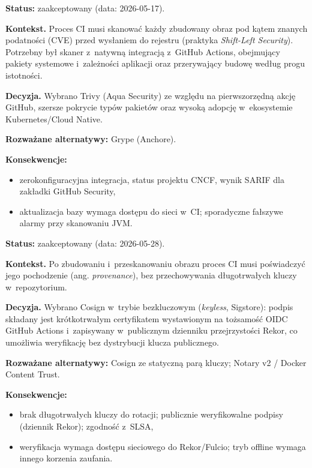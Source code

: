 \textbf{Status:} zaakceptowany (data: 2026-05-17).

\textbf{Kontekst.} Proces CI musi skanować każdy zbudowany obraz pod kątem znanych podatności (CVE) przed wysłaniem do rejestru (praktyka \textit{Shift-Left Security}). Potrzebny był skaner z~natywną integracją z~GitHub Actions, obejmujący pakiety systemowe i~zależności aplikacji oraz przerywający budowę według progu istotności.

\textbf{Decyzja.} Wybrano Trivy (Aqua Security) ze względu na pierwszorzędną akcję GitHub, szersze pokrycie typów pakietów oraz wysoką adopcję w~ekosystemie Kubernetes/Cloud Native.

\textbf{Rozważane alternatywy:} Grype (Anchore).

\textbf{Konsekwencje:}
\begin{itemize}
  \item[$+$] zerokonfiguracyjna integracja, status projektu CNCF, wynik SARIF dla zakładki GitHub Security,
  \item[$-$] aktualizacja bazy wymaga dostępu do sieci w~CI; sporadyczne fałszywe alarmy przy skanowaniu JVM.
\end{itemize}


\textbf{Status:} zaakceptowany (data: 2026-05-28).

\textbf{Kontekst.} Po zbudowaniu i~przeskanowaniu obrazu proces CI musi poświadczyć jego pochodzenie (ang. \textit{provenance}), bez przechowywania długotrwałych kluczy w~repozytorium.

\textbf{Decyzja.} Wybrano Cosign w~trybie bezkluczowym (\textit{keyless}, Sigstore): podpis składany jest krótkotrwałym certyfikatem wystawionym na tożsamość OIDC GitHub Actions i~zapisywany w~publicznym dzienniku przejrzystości Rekor, co umożliwia weryfikację bez dystrybucji klucza publicznego.

\textbf{Rozważane alternatywy:} Cosign ze statyczną parą kluczy; Notary v2 / Docker Content Trust.

\textbf{Konsekwencje:}
\begin{itemize}
  \item[$+$] brak długotrwałych kluczy do rotacji; publicznie weryfikowalne podpisy (dziennik Rekor); zgodność z~SLSA,
  \item[$-$] weryfikacja wymaga dostępu sieciowego do Rekor/Fulcio; tryb offline wymaga innego korzenia zaufania.
\end{itemize}

